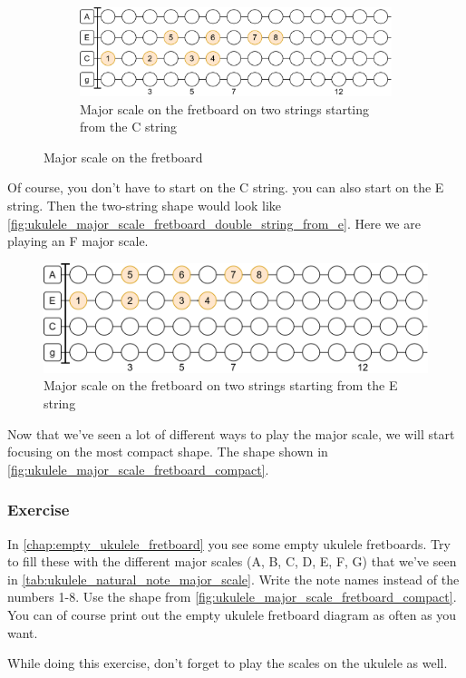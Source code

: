 \begin{figure}[h]
	\vspace{0.5cm}
	\begin{subfigure}[b]{\textwidth}
		\centering
		\includegraphics[width=\textwidth]{../../Images/ukulele_major_scale_double_string_from_c.png}
		\caption{Major scale on the fretboard on two strings starting from the C string}
		\label{fig:ukulele_major_scale_fretboard_double_string_from_c}
	\end{subfigure}
	
	\caption{Major scale on the fretboard}
	\label{fig:ukulele_major_scale_fretboard}
\end{figure}

\newpage

Of course, you don't have to start on the C string. you can also start on the E string. Then the two-string shape would look like \autoref{fig:ukulele_major_scale_fretboard_double_string_from_e}. Here we are playing an F major scale.

\begin{figure}[h]
	\centering
	\includegraphics[width=\textwidth]{../../Images/ukulele_major_scale_double_string_from_e.png}
	\caption{Major scale on the fretboard on two strings starting from the E string}
	\label{fig:ukulele_major_scale_fretboard_double_string_from_e}
\end{figure}

Now that we've seen a lot of different ways to play the major scale, we will start focusing on the most compact shape. The shape shown in \autoref{fig:ukulele_major_scale_fretboard_compact}.

\subsubsection{Exercise}

In \autoref{chap:empty_ukulele_fretboard} you see some empty ukulele fretboards. Try to fill these with the different major scales (A, B, C, D, E, F, G) that we've seen in \autoref{tab:ukulele_natural_note_major_scale}. Write the note names instead of the numbers 1-8. Use the shape from \autoref{fig:ukulele_major_scale_fretboard_compact}. You can of course print out the empty ukulele fretboard diagram as often as you want.

While doing this exercise, don't forget to play the scales on the ukulele as well.

